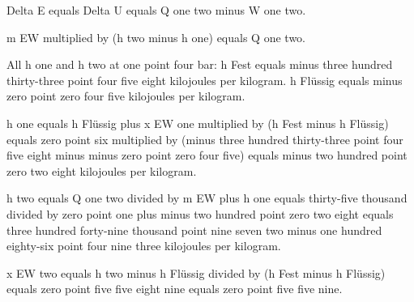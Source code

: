 Delta E equals Delta U equals Q one two minus W one two.  

m EW multiplied by (h two minus h one) equals Q one two.  

All h one and h two at one point four bar:  
h Fest equals minus three hundred thirty-three point four five eight kilojoules per kilogram.  
h Flüssig equals minus zero point zero four five kilojoules per kilogram.  

h one equals h Flüssig plus x EW one multiplied by (h Fest minus h Flüssig) equals zero point six multiplied by (minus three hundred thirty-three point four five eight minus minus zero point zero four five) equals minus two hundred point zero two eight kilojoules per kilogram.  

h two equals Q one two divided by m EW plus h one equals thirty-five thousand divided by zero point one plus minus two hundred point zero two eight equals three hundred forty-nine thousand point nine seven two minus one hundred eighty-six point four nine three kilojoules per kilogram.  

x EW two equals h two minus h Flüssig divided by (h Fest minus h Flüssig) equals zero point five five eight nine equals zero point five five nine.